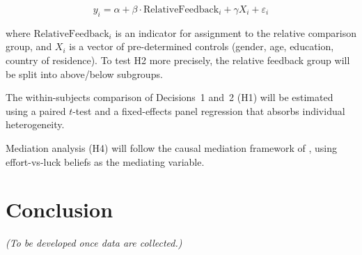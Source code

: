 \documentclass[12pt]{article}
\begin{document}
\begin{equation}
  y_i = \alpha + \beta \cdot \text{RelativeFeedback}_i + \gamma X_i + \varepsilon_i
  \label{eq:main}
\end{equation}

where $\text{RelativeFeedback}_i$ is an indicator for assignment to the relative comparison group, and $X_i$ is a vector of pre-determined controls (gender, age, education, country of residence). To test H2 more precisely, the relative feedback group will be split into above/below subgroups.

The within-subjects comparison of Decisions~1 and~2 (H1) will be estimated using a paired $t$-test and a fixed-effects panel regression that absorbs individual heterogeneity.

Mediation analysis (H4) will follow the causal mediation framework of \citet{imai2010}, using effort-vs-luck beliefs as the mediating variable.

\section{Conclusion}
\label{sec:conclusion}

\textit{(To be developed once data are collected.)}
\end{document}
